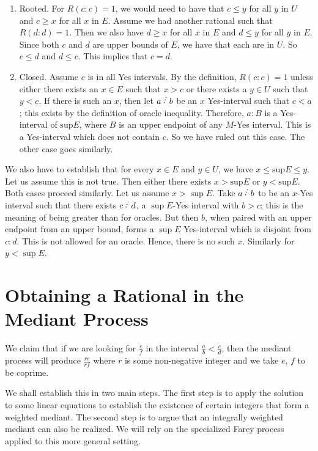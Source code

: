 \documentclass[12pt]{article}
\begin{document}
\begin{enumerate}
    \item Rooted. For $R(c:c)=1$, we would need to have that $c \leq y$ for all $y$ in $U$ and $c \geq x$ for all $x$ in $E$. Assume we had another rational such that $R(d:d) = 1$. Then we also have $d \geq x$ for all $x$ in $E$ and $d \leq y$ for all $y$ in $E$. Since both $c$ and $d$ are upper bounds of $E$, we have that each are in $U$. So $c \leq d$ and $d \leq c$. This implies that $c = d$. 
    \item Closed. Assume $c$ is in all Yes intervals. By the definition, $R(c:c) = 1$ unless either there exists an $x \in E$ such that $x> c$ or there exists a $y \in U$ such that $y < c$. If there is such an $x$, then let $a\lte b$ be an $x$ Yes-interval such that $c < a$; this exists by the definition of oracle inequality. Therefore, $a:B$ is a Yes-interval of $\mathrm{sup} E$, where $B$ is an upper endpoint of any $M$-Yes interval. This is a Yes-interval which does not contain $c$. So we have ruled out this case. The other case goes similarly.
\end{enumerate}

We also have to establish that for every $x \in E$ and $y \in U$, we have $x \leq \mathrm{sup} E \leq y$. Let us assume this is not true. Then either there exists $x > \mathrm{sup} E$ or $y < \mathrm{sup} E$. Both cases proceed similarly. Let us 
assume $ x > \sup E$. Take $a \lte b$ to be an $x$-Yes interval such that there exists $c \lte d$, a $\sup E$-Yes interval with $b > c$; this is the meaning of being greater than for oracles. But then $b$, when paired with an upper endpoint from an upper bound, forms a $\sup E$ Yes-interval which is disjoint from $c:d$. This is not allowed for an oracle. Hence, there is no such $x$. Similarly for $y < \sup E$. 

\section{Obtaining a Rational in the Mediant Process}\label{app:med}

We claim that if we are looking for $\frac{e}{f}$ in the interval $\frac{a}{b} \lt \frac{c}{d}$, then the mediant process will produce $\frac{re}{rf}$ where $r$ is some non-negative integer and we take $e$, $f$ to be coprime. 

We shall establish this in two main steps. The first step is to apply the solution to some linear equations to establish the existence of certain integers that form a weighted mediant. The second step is to argue that an integrally weighted mediant can also be realized.  We will rely on the specialized Farey process applied to this more general setting. 
\end{document}
